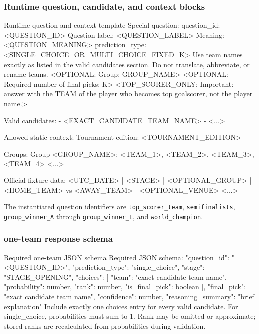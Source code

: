\documentclass[sigconf,nonacm]{acmart}
\newcommand{\promptheadingbreak}{\leavevmode\par\nopagebreak[4]}
\begin{document}
\subsubsection*{Runtime question, candidate, and context blocks}
\promptheadingbreak
\begin{promptbox}{Runtime question and context template}
Special question:
question_id: <QUESTION_ID>
Question label: <QUESTION_LABEL>
Meaning: <QUESTION_MEANING>
prediction_type: <SINGLE_CHOICE_OR_MULTI_CHOICE_FIXED_K>
Use team names exactly as listed in the valid candidates section. Do not translate, abbreviate, or rename teams.
<OPTIONAL: Group: GROUP_NAME>
<OPTIONAL: Required number of final picks: K>
<TOP_SCORER_ONLY: Important: answer with the TEAM of the player who becomes top goalscorer, not the player name.>

Valid candidates:
- <EXACT_CANDIDATE_TEAM_NAME>
- <...>

Allowed static context:
Tournament edition: <TOURNAMENT_EDITION>

Groups:
Group <GROUP_NAME>: <TEAM_1>, <TEAM_2>, <TEAM_3>, <TEAM_4>
<...>

Official fixture data:
<UTC_DATE> | <STAGE> | <OPTIONAL_GROUP> | <HOME_TEAM> vs <AWAY_TEAM> | <OPTIONAL_VENUE>
<...>
\end{promptbox}

The instantiated question identifiers are \texttt{top\_scorer\_team}, \texttt{semifinalists}, \texttt{group\_winner\_A} through \texttt{group\_winner\_L}, and \texttt{world\_champion}.

\subsubsection*{one-team response schema}
\promptheadingbreak
\begin{promptbox}{Required one-team JSON schema}
Required JSON schema:
{
  "question_id": "<QUESTION_ID>",
  "prediction_type": "single_choice",
  "stage": "STAGE_OPENING",
  "choices": [
    {
      "team": "exact candidate team name",
      "probability": number,
      "rank": number,
      "is_final_pick": boolean
    }
  ],
  "final_pick": "exact candidate team name",
  "confidence": number,
  "reasoning_summary": "brief explanation"
}
Include exactly one choices entry for every valid candidate. For single_choice, probabilities must sum to 1.
Rank may be omitted or approximate; stored ranks are recalculated from probabilities during validation.
\end{promptbox}
\end{document}
